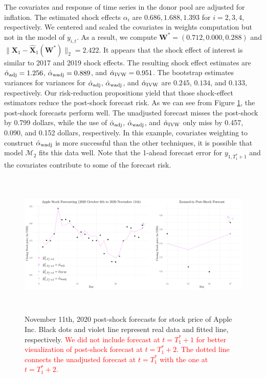 \documentclass[11pt,3p,review,authoryear]{elsarticle}
\def\mbf#1{\mathbf{#1}} %
\def\mc#1{\mathcal{#1}} %
\theoremstyle{definition}
\begin{document}
The covariates and response of time series in the donor pool are adjusted for inflation. The estimated shock effects $\alpha_i$ are $0.686, 1.688, 1.393$ for $i = 2, 3, 4$, respectively. We centered and scaled the covariates in weights computation but not in the model of $y_{i,t}$. As a result, we compute $\mathbf{W}^* = (0.712, 0.000, 0.288)$ and $
  \|\mbf{X}_1-\hat{\mbf{X}}_1(\mbf{W}^*)\|_2 = 2.422$. It appears that  the shock effect of interest is similar to 2017 and 2019 shock effects. The resulting shock effect estimates are $\hat{\alpha}_{\rm adj}= 1.256$, $\hat{\alpha}_{\rm wadj}=0.889$, and $\hat{\alpha}_{\rm IVW} = 0.951$. The bootstrap estimates variances for variances for $\hat{\alpha}_{\rm adj}$, $\hat{\alpha}_{\rm wadj}$,  and $\hat{\alpha}_{\rm IVW}$ are $0.245$, $0.134$, and $0.133$, respectively. Our risk-reduction propositions yield that those shock-effect estimators reduce the post-shock forecast risk. As we can see from Figure \ref{Fig3}, the post-shock forecasts perform well. The unadjusted forecast misses the post-shock by 0.799 dollars, while the use of $\hat{\alpha}_{\rm adj}$, $\hat{\alpha}_{\rm wadj}$, and $\hat{\alpha}_{\rm IVW}$ only miss by 0.457, 0.090, and 0.152 dollars, respectively. In this example, covariates weighting to construct $\hat{\alpha}_{\rm wadj}$ is more successful than the other techniques, it is possible that model $\mc{M}_2$ fits this data well. Note  that the 1-ahead forecast error for $y_{1, T_1^*+1}$ and the covariates contribute to some of the forecast risk.

\begin{figure}[t!]
  \begin{center}
    \includegraphics[height = 7cm, width = 16.8cm]{FIG3.pdf}
    \caption{November 11th, 2020 post-shock forecasts for stock price of Apple Inc. Black dots and violet line represent real data and fitted line, respectively. \textcolor{red}{We did not include forecast at $t=T_1^*+1$ for better visualization of post-shock forecast at $t=T_1^*+2$. The dotted line connects the unadjusted forecast at $t=T_1^*$ with the one at $t=T_1^*+2$.}}
    \label{Fig3}
  \end{center}  
  \vspace{-.6cm}
\end{figure}
\end{document}
